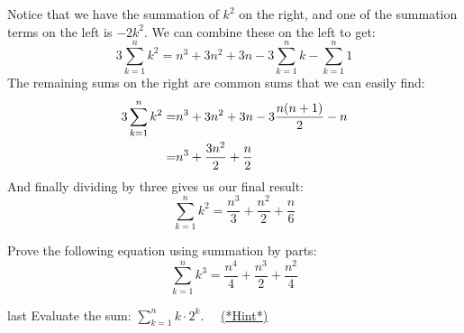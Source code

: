 Notice that we have the summation of $k^2$ on the right, and one of the summation terms on the left is $-2k^2$.  We can combine these on the left to get:
\[ 3 \sum_{k=1}^n k^2 =n^3 + 3n^2 + 3n - 3\sum_{k=1}^n k - \sum_{k=1}^n 1 \]
The remaining sums on the right are common sums that we can easily find:
\begin{align}
3 \sum_{k=1}^n k^2 =& n^3 + 3n^2 + 3n - 3\frac{n(n+1)}{2} - n \notag\\
=& n^3 + \frac{3n^2}{2} + \frac{n}{2} \notag
\end{align}
And finally dividing by three gives us our final result:
\[ \sum_{k=1}^n k^2 = \frac{n^3}{3} + \frac{n^2}{2} + \frac{n}{6} \]

\begin{exercise}{}
Prove the following equation using summation by parts:
\[ \sum_{k=1}^n k^3 = \frac{n^4}{4} + \frac{n^3}{2} + \frac{n^2}{4} \]
\end{exercise}

\begin{exercise}{last} Evaluate the sum: $\displaystyle{\sum_{k=1}^n k \cdot 2^k.}$~~
\hyperref[sec:sigma:hints]{(*Hint*)} 
\end{exercise}
